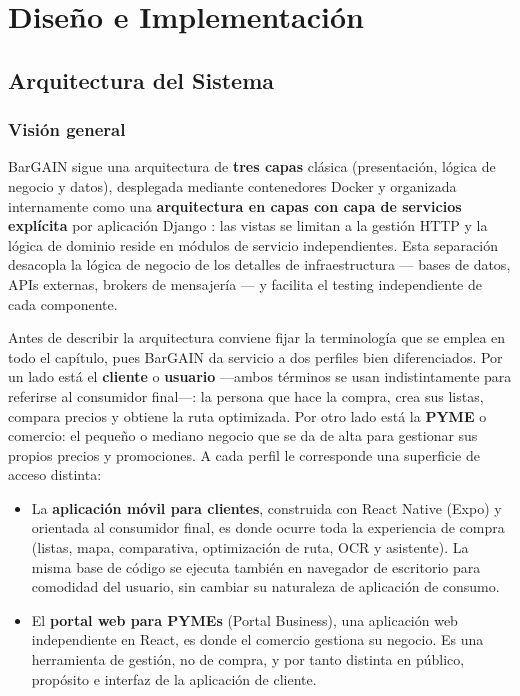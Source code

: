 
\chapter{Dise\~no e Implementaci\'on}\label{cap08}

\section{Arquitectura del Sistema}\label{sec:arquitectura}

\subsection{Visi\'on general}\label{subsec:vision-general}

BarGAIN sigue una arquitectura de \textbf{tres capas} cl\'asica (presentaci\'on, l\'ogica de
negocio y datos), desplegada mediante contenedores Docker y organizada internamente como una
\textbf{arquitectura en capas con capa de servicios expl\'icita} por aplicaci\'on Django
\cite{django_docs, drf_docs}: las vistas se limitan a la gesti\'on HTTP y la l\'ogica de dominio
reside en m\'odulos de servicio independientes. Esta separaci\'on desacopla la l\'ogica de
negocio de los detalles de infraestructura --- bases de datos, APIs externas, brokers de
mensajer\'ia --- y facilita el testing independiente de cada componente.

Antes de describir la arquitectura conviene fijar la terminolog\'ia que se emplea en todo el
cap\'itulo, pues BarGAIN da servicio a dos perfiles bien diferenciados. Por un lado est\'a el
\textbf{cliente} o \textbf{usuario} ---ambos t\'erminos se usan indistintamente para referirse al
consumidor final---: la persona que hace la compra, crea sus listas, compara precios y obtiene la
ruta optimizada. Por otro lado est\'a la \textbf{PYME} o comercio: el peque\~no o mediano negocio
que se da de alta para gestionar sus propios precios y promociones. A cada perfil le corresponde una
superficie de acceso distinta:

\begin{itemize}
  \item La \textbf{aplicaci\'on m\'ovil para clientes}, construida con React Native (Expo) y
    orientada al consumidor final, es donde ocurre toda la experiencia de compra (listas, mapa,
    comparativa, optimizaci\'on de ruta, OCR y asistente). La misma base de c\'odigo se ejecuta
    tambi\'en en navegador de escritorio para comodidad del usuario, sin cambiar su naturaleza de
    aplicaci\'on de consumo.
  \item El \textbf{portal web para PYMEs} (Portal Business), una aplicaci\'on web independiente en
    React, es donde el comercio gestiona su negocio. Es una herramienta de gesti\'on, no de compra,
    y por tanto distinta en p\'ublico, prop\'osito e interfaz de la aplicaci\'on de cliente.
\end{itemize}

